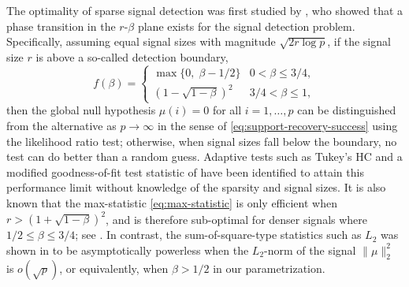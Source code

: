 
The optimality of sparse signal detection was first studied by \citet{ingster1998minimax}, who showed that a phase transition in the $r$-$\beta$ plane exists for the signal detection problem. 
Specifically, assuming equal signal sizes with magnitude $\sqrt{2{r}\log{p}}$, if the signal size $r$ is above a so-called detection boundary,
\begin{equation} \label{eq:detection-boundary-large-signals}
    f(\beta) = 
    \begin{cases}
        \max\{0,\; \beta - 1/2\} & 0 < \beta \le 3/4, \\
        \left(1 - \sqrt{1-\beta}\right)^2 & 3/4 < \beta \le 1,
    \end{cases}
\end{equation} 
then the global null hypothesis $\mu(i)=0$ for all $i=1,\ldots,p$ can be distinguished from the alternative as $p\to\infty$ in the sense of \eqref{eq:support-recovery-success} using the likelihood ratio test; 
otherwise, when signal sizes fall below the boundary, no test can do better than a random guess.
Adaptive tests such as Tukey's \ac{HC} \citep{donoho2004higher} and a modified goodness-of-fit test statistic of \citet{zhang2002powerful} have been identified to attain this performance limit without knowledge of the sparsity and signal sizes. 
It is also known that the max-statistic \eqref{eq:max-statistic} is only efficient when $r>(1+\sqrt{1-\beta})^2$, and is therefore sub-optimal for denser signals where $1/2\le\beta\le 3/4$; see \cite{cai2011optimal}.
In contrast, the sum-of-square-type statistics such as $L_2$ was shown in \cite{fan1996test} to be asymptotically powerless when the $L_2$-norm of the signal $\|\mu\|_2^2$ is $o(\sqrt{p})$, or equivalently, when $\beta>1/2$ in our parametrization.

